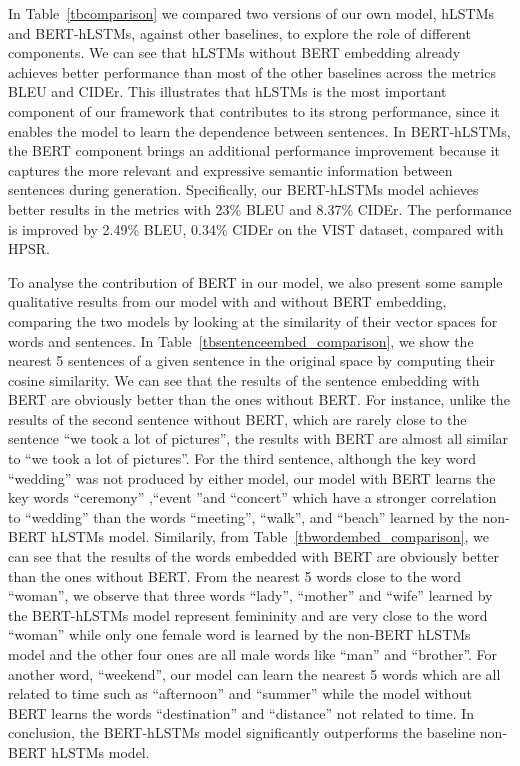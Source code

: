 \documentclass[a4paper,fleqn]{cas-sc}
\begin{document}
In Table~\ref{tbcomparison}  we compared two versions of our own model, hLSTMs and BERT-hLSTMs, against other baselines, to explore the role of different components. We can see that hLSTMs without BERT embedding already achieves better performance than most of the other baselines across the metrics BLEU and CIDEr. This illustrates that hLSTMs is the most important component of our framework that contributes to its strong performance, since it enables the model to learn the dependence between sentences. In BERT-hLSTMs, the BERT component brings an additional performance improvement because it captures the more relevant and expressive semantic information between sentences during generation. Specifically, our BERT-hLSTMs model achieves  better results in the metrics with 23\% BLEU and 8.37\% CIDEr. The performance is improved by 2.49\% BLEU, 0.34\% CIDEr on the VIST dataset, compared with HPSR.

To analyse the contribution of BERT in our model, we also present some sample qualitative results from our model with and without BERT embedding, comparing the two models by looking at the similarity of their vector spaces for words and sentences.
In Table~\ref{tbsentenceembed_comparison}, we show the nearest 5 sentences of a given sentence in the original space by computing their cosine similarity. We can see that the results of the sentence embedding with BERT are obviously better than the ones without BERT. For instance, unlike the results of the second sentence without BERT, which are rarely close to the sentence  ``we took a lot of pictures'', the results with BERT are almost all similar to  ``we took a lot of pictures''. For the third sentence, although the key word  ``wedding'' was not produced by either model, our model with BERT learns the key words  ``ceremony'' ,``event ''and  ``concert'' which have a stronger correlation to  ``wedding'' than the words  ``meeting'',  ``walk'', and  ``beach'' learned by the non-BERT hLSTMs model. Similarily, from Table~\ref{tbwordembed_comparison}, we can see that the results of the words embedded with BERT are obviously better than the ones without BERT. From the nearest 5 words close to the word  ``woman'', we observe that three words  ``lady'',  ``mother'' and  ``wife'' learned by the BERT-hLSTMs model represent femininity and are very close to the word  ``woman'' while only one female word is learned by the non-BERT hLSTMs model and the other four ones are all male words like  ``man'' and ``brother''. For another word,  ``weekend'', our model can learn the nearest 5 words which are all related to time such as  ``afternoon'' and  ``summer'' while the model without BERT learns the words  ``destination'' and  ``distance'' not related to time. In conclusion, the BERT-hLSTMs model significantly outperforms the baseline non-BERT hLSTMs model.
\end{document}
